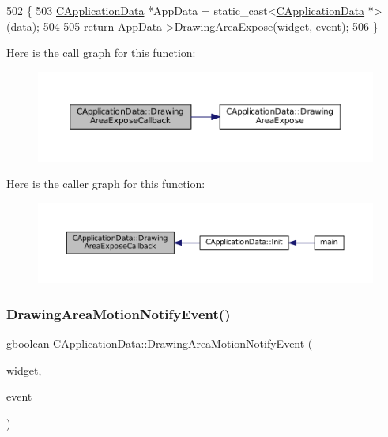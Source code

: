 \begin{DoxyCode}
502                                                                                                            
      \{
503     \hyperlink{classCApplicationData}{CApplicationData} *AppData = \textcolor{keyword}{static\_cast<}\hyperlink{classCApplicationData}{CApplicationData} *\textcolor{keyword}{>}(data);
504 
505     \textcolor{keywordflow}{return} AppData->\hyperlink{classCApplicationData_ae998e896194920e08f69f321f3bc9500}{DrawingAreaExpose}(widget, event);
506 \}
\end{DoxyCode}
Here is the call graph for this function\+:\nopagebreak
\begin{figure}[H]
\begin{center}
\leavevmode
\includegraphics[width=350pt]{classCApplicationData_af2ec09e61420f6c493d7ef25e4a7bd11_cgraph}
\end{center}
\end{figure}
Here is the caller graph for this function\+:\nopagebreak
\begin{figure}[H]
\begin{center}
\leavevmode
\includegraphics[width=350pt]{classCApplicationData_af2ec09e61420f6c493d7ef25e4a7bd11_icgraph}
\end{center}
\end{figure}
\hypertarget{classCApplicationData_a9b53201c01b399df18b02d1e93213e45}{}\label{classCApplicationData_a9b53201c01b399df18b02d1e93213e45} 
\subsubsection{\texorpdfstring{Drawing\+Area\+Motion\+Notify\+Event()}{DrawingAreaMotionNotifyEvent()}}
{\footnotesize\ttfamily gboolean C\+Application\+Data\+::\+Drawing\+Area\+Motion\+Notify\+Event (\begin{DoxyParamCaption}\item[{Gtk\+Widget $\ast$}]{widget,  }\item[{Gdk\+Event\+Motion $\ast$}]{event }\end{DoxyParamCaption})\hspace{0.3cm}{\ttfamily [protected]}}



